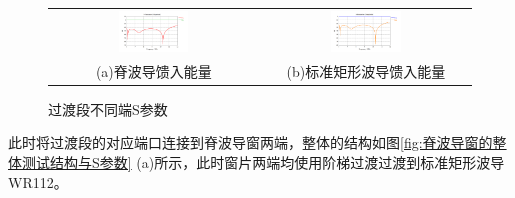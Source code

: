 \documentclass[master]{thesis-uestc}
\begin{document}
\begin{figure}[!htb]
    \small
    \centering
    \begin{tabular}{@{\ }c@{\ }c}
        \includegraphics[width=0.35\textwidth]{pic/chapter3/一端口馈入.png} & 
        \hspace{5pt}
        \includegraphics[width=0.35\textwidth]{pic/chapter3/二端口馈入.png}     \\
        \mbox{\small (a)脊波导馈入能量}                                                                               & 
        \mbox{\small (b)标准矩形波导馈入能量}                                                                                  \\
    \end{tabular}
    \caption{过渡段不同端S参数}
    \label{fig:过渡段不同端馈入的S参数}
\end{figure}

此时将过渡段的对应端口连接到脊波导窗两端，整体的结构如图\ref{fig:脊波导窗的整体测试结构与S参数} (a)所示，此时窗片两端均使用阶梯过渡过渡到标准矩形波导WR112。
\end{document}
